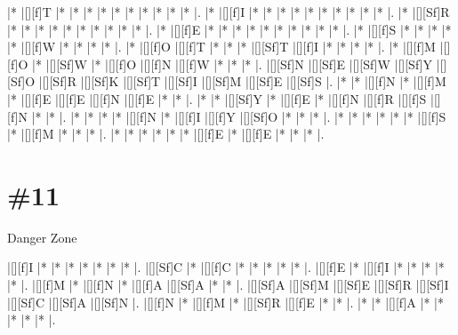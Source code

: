 \documentclass[letterpaper]{article}
\begin{document}
\vspace*{1em}
\begin{Puzzle}{12}{13}
|*        |[][f]T   |*        |*        |*        |*        |*        |*        |*        |*        |*        |*        |.
|*        |[][f]I   |*        |*        |*        |*        |*        |*        |*        |*        |*        |*        |.
|*        |[][Sf]R  |*        |*        |*        |*        |*        |*        |*        |*        |*        |*        |.
|*        |[][f]E   |*        |*        |*        |*        |*        |*        |*        |*        |*        |*        |.
|*        |[][f]S   |*        |*        |*        |*        |*        |[][f]W   |*        |*        |*        |*        |.
|*        |[][f]O   |[][f]T   |*        |*        |*        |[][Sf]T  |[][f]I   |*        |*        |*        |*        |.
|*        |[][f]M   |[][f]O   |*        |[][Sf]W  |*        |[][f]O   |[][f]N   |[][f]W   |*        |*        |*        |.
|[][Sf]N  |[][Sf]E  |[][Sf]W  |[][Sf]Y  |[][Sf]O  |[][Sf]R  |[][Sf]K  |[][Sf]T  |[][Sf]I  |[][Sf]M  |[][Sf]E  |[][Sf]S  |.
|*        |*        |[][f]N   |*        |[][f]M   |*        |[][f]E   |[][f]E   |[][f]N   |[][f]E   |*        |*        |.
|*        |*        |[][Sf]Y  |*        |[][f]E   |*        |[][f]N   |[][f]R   |[][f]S   |[][f]N   |*        |*        |.
|*        |*        |*        |*        |[][f]N   |*        |[][f]I   |[][f]Y   |[][Sf]O  |*        |*        |*        |.
|*        |*        |*        |*        |*        |*        |[][f]S   |*        |[][f]M   |*        |*        |*        |.
|*        |*        |*        |*        |*        |*        |[][f]E   |*        |[][f]E   |*        |*        |*        |.
\end{Puzzle}


\section*{\#11}
Danger Zone

\vspace*{1em}
\begin{Puzzle}{8}{7}
|[][f]I   |*        |*        |*        |*        |*        |*        |*        |. 
|[][Sf]C  |*        |[][f]C   |*        |*        |*        |*        |*        |.  
|[][f]E   |*        |[][f]I   |*        |*        |*        |*        |*        |.
|[][f]M   |*        |[][f]N   |*        |[][f]A   |[][Sf]A  |*        |*        |.  
|[][Sf]A  |[][Sf]M  |[][Sf]E  |[][Sf]R  |[][Sf]I  |[][Sf]C  |[][Sf]A  |[][Sf]N  |.
|[][f]N   |*        |[][f]M   |*        |[][Sf]R  |[][f]E   |*        |*        |. 
|*        |*        |[][f]A   |*        |*        |*        |*        |*        |.
\end{Puzzle}
\end{document}
